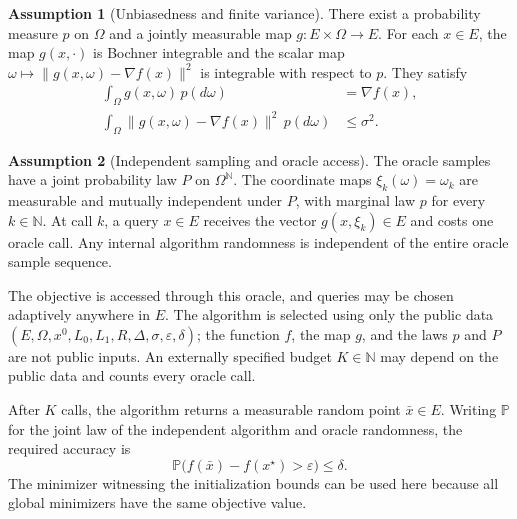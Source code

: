 \documentclass[10pt]{article}
\theoremstyle{definition}
\newtheorem{assumption}{Assumption}
\begin{document}
\begin{assumption}[Unbiasedness and finite variance]
There exist a probability measure $p$ on $\Omega$ and a jointly measurable map $g:E\times\Omega\to E$. For each $x\in E$, the map $g(x,\cdot)$ is Bochner integrable and the scalar map $\omega\mapsto\|g(x,\omega)-\nabla f(x)\|^2$ is integrable with respect to $p$. They satisfy
\begin{align*}
\int_{\Omega}g(x,\omega)\,p(d\omega)&=\nabla f(x),\\
\int_{\Omega}\|g(x,\omega)-\nabla f(x)\|^2\,p(d\omega)&\leq\sigma^2.
\end{align*}
\end{assumption}

\begin{assumption}[Independent sampling and oracle access]
The oracle samples have a joint probability law $P$ on $\Omega^{\mathbb{N}}$. The coordinate maps $\xi_k(\omega)=\omega_k$ are measurable and mutually independent under $P$, with marginal law $p$ for every $k\in\mathbb{N}$. At call $k$, a query $x\in E$ receives the vector $g(x,\xi_k)\in E$ and costs one oracle call. Any internal algorithm randomness is independent of the entire oracle sample sequence.
\end{assumption}

The objective is accessed through this oracle, and queries may be chosen adaptively anywhere in $E$. The algorithm is selected using only the public data $(E,\Omega,x^0,L_0,L_1,R,\Delta,\sigma,\varepsilon,\delta)$; the function $f$, the map $g$, and the laws $p$ and $P$ are not public inputs. An externally specified budget $K\in\mathbb{N}$ may depend on the public data and counts every oracle call.

After $K$ calls, the algorithm returns a measurable random point $\bar{x}\in E$. Writing $\mathbb{P}$ for the joint law of the independent algorithm and oracle randomness, the required accuracy is
\[
\mathbb{P}\bigl(f(\bar{x})-f(x^\star)>\varepsilon\bigr)\leq\delta.
\]
The minimizer witnessing the initialization bounds can be used here because all global minimizers have the same objective value.
\end{document}
